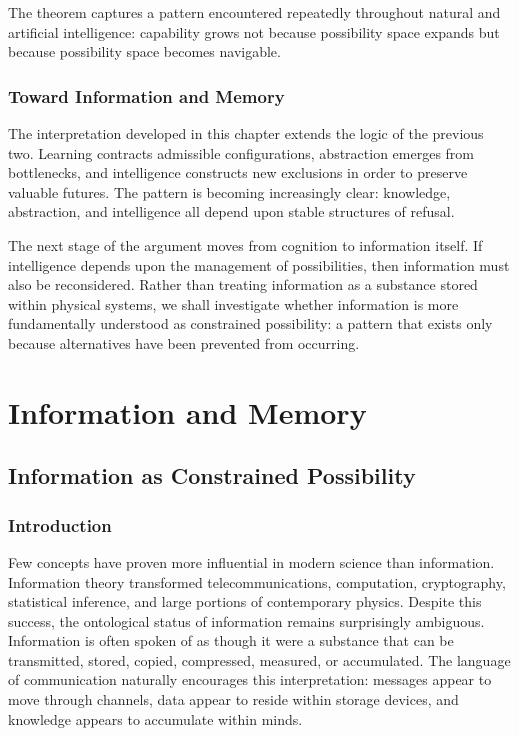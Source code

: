 \documentclass[11pt,oneside]{book}
\theoremstyle{plain}
\theoremstyle{definition}
\theoremstyle{remark}
\begin{document}
The theorem captures a pattern encountered repeatedly throughout natural and artificial intelligence: capability grows not because possibility space expands but because possibility space becomes navigable.

\section{Toward Information and Memory}

The interpretation developed in this chapter extends the logic of the previous two. Learning contracts admissible configurations, abstraction emerges from bottlenecks, and intelligence constructs new exclusions in order to preserve valuable futures. The pattern is becoming increasingly clear: knowledge, abstraction, and intelligence all depend upon stable structures of refusal.

The next stage of the argument moves from cognition to information itself. If intelligence depends upon the management of possibilities, then information must also be reconsidered. Rather than treating information as a substance stored within physical systems, we shall investigate whether information is more fundamentally understood as constrained possibility: a pattern that exists only because alternatives have been prevented from occurring.

\part{Information and Memory}

\chapter{Information as Constrained Possibility}

\section{Introduction}

Few concepts have proven more influential in modern science than information. Information theory transformed telecommunications, computation, cryptography, statistical inference, and large portions of contemporary physics. Despite this success, the ontological status of information remains surprisingly ambiguous. Information is often spoken of as though it were a substance that can be transmitted, stored, copied, compressed, measured, or accumulated. The language of communication naturally encourages this interpretation: messages appear to move through channels, data appear to reside within storage devices, and knowledge appears to accumulate within minds.
\end{document}

